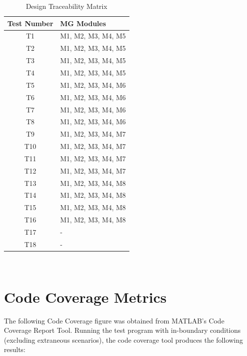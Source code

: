 \documentclass[12pt, titlepage]{article}
\begin{document}
\begin{table} [H]
  \caption{Design Traceability Matrix}
  \label{Table:Table_Traceability_MG}  
\begin{tabular}{|c|p{8cm}|}
  \hline	
  \textbf{Test Number} & \textbf{MG Modules}\\
  \hline 
   T1& M1, M2, M3, M4, M5\\ \hline
   T2& M1, M2, M3, M4, M5\\ \hline
   T3& M1, M2, M3, M4, M5\\ \hline
   T4& M1, M2, M3, M4, M5\\ \hline
   T5& M1, M2, M3, M4, M6\\ \hline
   T6& M1, M2, M3, M4, M6\\ \hline
   T7& M1, M2, M3, M4, M6\\ \hline
   T8& M1, M2, M3, M4, M6\\ \hline
   T9& M1, M2, M3, M4, M7\\ \hline
   T10& M1, M2, M3, M4, M7\\ \hline
   T11& M1, M2, M3, M4, M7\\ \hline
   T12& M1, M2, M3, M4, M7\\ \hline
   T13& M1, M2, M3, M4, M8\\ \hline
   T14& M1, M2, M3, M4, M8\\ \hline
   T15& M1, M2, M3, M4, M8\\ \hline
   T16& M1, M2, M3, M4, M8\\ \hline
   T17& - \\ \hline
   T18& - \\ \hline

\end{tabular}\\
\end{table}

\section{Code Coverage Metrics} \label{sec_ccm}
The following Code Coverage figure was obtained from MATLAB's 
Code Coverage Report Tool. Running the test program with in-boundary
conditions (excluding extraneous scenarios), the code coverage tool
produces the following results:\\
\end{document}
